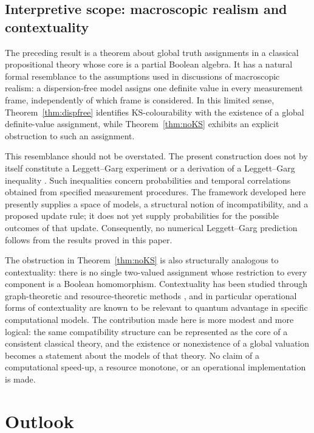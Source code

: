 \documentclass{article}   	%
\theoremstyle{plain}
\theoremstyle{definition}
\theoremstyle{remark}
\begin{document}
\subsection{Interpretive scope: macroscopic realism and contextuality}
\label{subsec:interpretive-scope}

The preceding result is a theorem about global truth assignments in a classical
propositional theory whose core is a partial Boolean algebra.  It has a natural
formal resemblance to the assumptions used in discussions of macroscopic
realism: a dispersion-free model assigns one definite value in every
measurement frame, independently of which frame is considered.  In this
limited sense, Theorem~\ref{thm:dispfree} identifies KS-colourability with the
existence of a global definite-value assignment, while
Theorem~\ref{thm:noKS} exhibits an explicit obstruction to such an assignment.

This resemblance should not be overstated.  The present construction does not
by itself constitute a Leggett--Garg experiment or a derivation of a
Leggett--Garg inequality \cite{LeggettGarg1985}.  Such inequalities concern
probabilities and temporal correlations obtained from specified measurement
procedures.  The framework developed here presently supplies a space of
models, a structural notion of incompatibility, and a proposed update rule; it
does not yet supply probabilities for the possible outcomes of that update.
Consequently, no numerical Leggett--Garg prediction follows from the results
proved in this paper.

The obstruction in Theorem~\ref{thm:noKS} is also structurally analogous to
contextuality: there is no single two-valued assignment whose restriction to
every component is a Boolean homomorphism.  Contextuality has been studied
through graph-theoretic and resource-theoretic methods
\cite{Cabello2014,Howard2014}, and in particular operational forms of
contextuality are known to be relevant to quantum advantage in specific
computational models.  The contribution made here is more modest and more
logical: the same compatibility structure can be represented as the core of a
consistent classical theory, and the existence or nonexistence of a global
valuation becomes a statement about the models of that theory.  No claim of a
computational speed-up, a resource monotone, or an operational implementation
is made.

\section{Outlook}
\label{sec:outlook}
\end{document}
